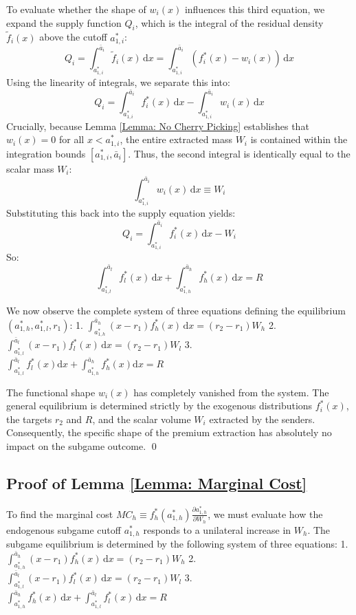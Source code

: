\documentclass[12pt, a4paper]{article}
\begin{document}
To evaluate whether the shape of $w_i(x)$ influences this third equation, we expand the supply function $Q_i$, which is the integral of the residual density $\tilde{f}_i(x)$ above the cutoff $a_{1,i}^*$:
\[
    Q_i = \int_{a_{1,i}^*}^{\bar{a}_i} \tilde{f}_i(x) \, \mathrm{d}x = \int_{a_{1,i}^*}^{\bar{a}_i} (f_i^*(x) - w_i(x)) \, \mathrm{d}x
\]
Using the linearity of integrals, we separate this into:
\[
    Q_i = \int_{a_{1,i}^*}^{\bar{a}_i} f_i^*(x) \, \mathrm{d}x - \int_{a_{1,i}^*}^{\bar{a}_i} w_i(x) \, \mathrm{d}x
\]
Crucially, because Lemma \ref{Lemma: No Cherry Picking} establishes that $w_i(x) = 0$ for all $x < a_{1,i}^*$, the entire extracted mass $W_i$ is contained within the integration bounds $[a_{1,i}^*, \bar{a}_i]$. Thus, the second integral is identically equal to the scalar mass $W_i$:
\[
    \int_{a_{1,i}^*}^{\bar{a}_i} w_i(x) \, \mathrm{d}x \equiv W_i
\]
Substituting this back into the supply equation yields:
\[
    Q_i = \int_{a_{1,i}^*}^{\bar{a}_i} f_i^*(x) \, \mathrm{d}x - W_i
\]
So:
\[\int_{a_{1,l}^*}^{\bar{a}_l} f_l^*(x) \, \mathrm{d}x + \int_{a_{1,h}^*}^{\bar{a}_h} f_h^*(x) \, \mathrm{d}x = R\]

We now observe the complete system of three equations defining the equilibrium $(a_{1,h}^*, a_{1,l}^*, r_1)$:
1. $\int_{a_{1,h}^*}^{\bar{a}_h} (x - r_1) f_h^*(x) \, \mathrm{d}x = (r_2 - r_1)W_h$
2. $\int_{a_{1,l}^*}^{\bar{a}_l} (x - r_1) f_l^*(x) \, \mathrm{d}x = (r_2 - r_1)W_l$
3. $\int_{a_{1,l}^*}^{\bar{a}_l} f_l^*(x) \mathrm{d}x +\int_{a_{1,h}^*}^{\bar{a}_h} f_h^*(x)\mathrm{d}x =R$

The functional shape $w_i(x)$ has completely vanished from the system. The general equilibrium is determined strictly by the exogenous distributions $f_i^*(x)$, the targets $r_2$ and $R$, and the scalar volume $W_i$ extracted by the senders. Consequently, the specific shape of the premium extraction has absolutely no impact on the subgame outcome. \qed


\subsection*{Proof of Lemma \ref{Lemma: Marginal Cost}}

To find the marginal cost $MC_h \equiv f_h^*(a_{1,h}^*) \frac{\partial a_{1,h}^*}{\partial W_h}$, we must evaluate how the endogenous subgame cutoff $a_{1,h}^*$ responds to a unilateral increase in $W_h$. The subgame equilibrium is determined by the following system of three equations:
1. $\int_{a_{1,h}^*}^{\bar{a}_h} (x - r_1) f_h^*(x) \, \mathrm{d}x = (r_2 - r_1) W_h$
2. $\int_{a_{1,l}^*}^{\bar{a}_l} (x - r_1) f_l^*(x) \, \mathrm{d}x = (r_2 - r_1) W_l$
3. $\int_{a_{1,h}^*}^{\bar{a}_h} f_h^*(x) \, \mathrm{d}x + \int_{a_{1,l}^*}^{\bar{a}_l} f_l^*(x) \, \mathrm{d}x = R$
\end{document}
